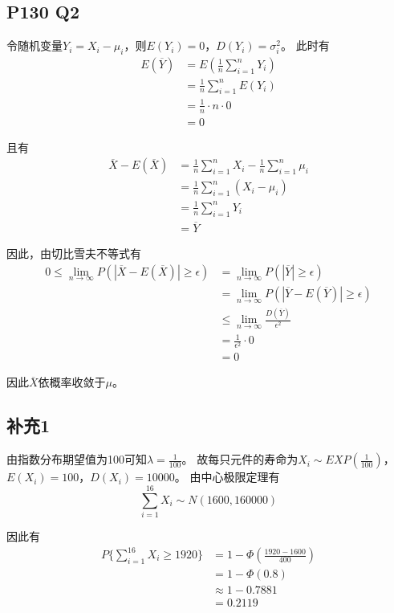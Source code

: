 \documentclass[a4paper,12pt]{ctexart}
\begin{document}
\subsection*{P130 Q2}

令随机变量$Y_i = X_i - \mu_i$，则$E(Y_i) = 0$，$D(Y_i) = \sigma_i^2$。
此时有
\begin{align*}
	E(\overline{Y}) &= E\left(\frac{1}{n}\sum_{i=1}^{n}Y_i\right) \\
	&= \frac{1}{n}\sum_{i=1}^{n}E(Y_i) \\
	&= \frac{1}{n} \cdot n \cdot 0 \\
	&= 0
\end{align*}

且有
\begin{align*}
	\overline{X} - E(\overline{X}) &= \frac{1}{n} \sum_{i=1}^{n} X_i - \frac{1}{n} \sum_{i=1}^{n} \mu_i \\
	&= \frac{1}{n} \sum_{i=1}^{n} (X_i - \mu_i) \\
	&= \frac{1}{n} \sum_{i=1}^{n} Y_i \\
	&= \overline{Y}
\end{align*}

因此，由切比雪夫不等式有
\begin{align*}
	0 \leq \lim_{n \rightarrow \infty} P(|\overline{X} - E(\overline{X})| \geq \epsilon) &= \lim_{n \rightarrow \infty} P(|\overline{Y}| \geq \epsilon) \\	
	&= \lim_{n \rightarrow \infty} P(|\overline{Y} - E(\overline{Y})| \geq \epsilon) \\
	&\leq \lim_{n \rightarrow \infty} \frac{D(\overline{Y})}{\epsilon^2} \\
	&= \frac{1}{\epsilon^2} \cdot 0 \\
	&= 0
\end{align*}

因此$\overline{X}$依概率收敛于$\mu$。

\subsection*{补充1}

由指数分布期望值为100可知$\lambda = \frac{1}{100}$。
故每只元件的寿命为$X_i \sim EXP(\frac{1}{100})$，$E(X_i) = 100$，$D(X_i) = 10000$。
由中心极限定理有
\begin{equation*}
	\sum_{i=1}^{16} X_i \sim N(1600, 160000)
\end{equation*}

因此有
\begin{align*}
	P\{\sum_{i=1}^{16} X_i \geq 1920\} &= 1 - \Phi\left(\frac{1920 - 1600}{400}\right) \\
	&= 1 - \Phi(0.8) \\
	&\approx 1 - 0.7881 \\
	&= 0.2119
\end{align*}
\end{document}
